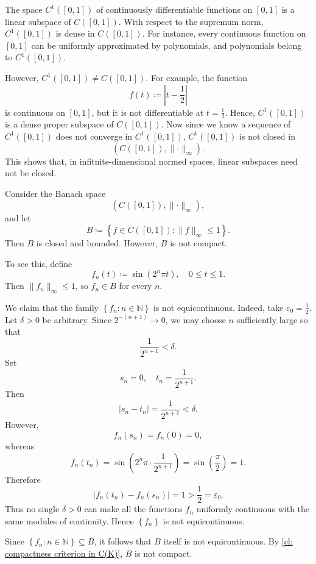 \begin{eg}
    The space \(C^1 ([0, 1])\) of continuously differentiable functions on \([0, 1]\) is a linear subspace of \(C([0, 1])\). With respect to the supremum norm, \(C^1 ([0, 1])\) is dense in \(C([0, 1])\). For instance, every continuous function on \([0, 1]\) can be uniformly approximated by polynomials, and polynomials belong to \(C^1 ([0, 1])\). 

    However, \(C^1 ([0, 1]) \neq C([0, 1])\). For example, the function 
    \[
        f(t) \coloneqq  \left\vert t - \frac{1}{2} \right\vert 
    \]         
    is continuous on \([0, 1]\), but it is not differentiable at \(t = \frac{1}{2}\). Hence, \(C^1 ([0, 1])\) is a dense proper subspace of \(C ([0, 1])\). Now since we know a sequence of \(C^1 ([0, 1])\) does not converge in \(C^1 ([0, 1])\), \(C^1 ([0, 1])\) is not closed in 
    \[
        \left( C([0, 1]), \lVert \cdot \rVert_\infty \right). 
    \]     
    This shows that, in infitnite-dimensional normed spaces, linear subspaces need not be closed.
\end{eg}

\begin{eg}
    Consider the Banach space 
    \[
        \left( C([0, 1]), \lVert \cdot \rVert_\infty  \right), 
    \]
    and let
    \[
        B \coloneqq \left\{ f \in C([0, 1]): \lVert f \rVert_\infty \le 1  \right\}. 
    \]
    Then \(B\) is closed and bounded. However, \(B\) is not compact. 

    To see this, define 
    \[
        f_n (t) \coloneqq \sin \left( 2^n \pi t \right), \quad 0 \le t \le 1. 
    \]  
    Then \(\lVert f_n \rVert_\infty \le 1 \), so \(f_n \in B\) for every \(n\). 

    We claim that the family \(\left\{ f_n: n \in \mathbb{N} \right\} \) is not equicontinuous. Indeed, take \(\varepsilon _0 = \frac{1}{2}\). Let \(\delta > 0\) be arbitrary. Since \(2^{-(n + 1)} \to 0\), we may choose \(n\) sufficiently large so that 
    \[
        \frac{1}{2^{n + 1}} < \delta.
    \]        
    Set 
    \[
        s_n = 0, \quad t_n = \frac{1}{2^{n + 1}}.
    \]
    Then 
    \[
        \vert s_n - t_n \vert = \frac{1}{2^{n + 1}} < \delta. 
    \]
    However, 
    \[
        f_n (s_n) = f_n (0) = 0,
    \]
    whereas 
    \[
        f_n (t_n) = \sin \left( 2^n \pi \cdot \frac{1}{2^{n+1} } \right) = \sin \left( \frac{\pi}{2} \right) = 1.  
    \]
    Therefore 
    \[
        \vert f_n (t_n) - f_n(s_n) \vert = 1 > \frac{1}{2} = \varepsilon_0. 
    \]
    Thus no single \(\delta > 0\) can make all the functions \(f_n\) uniformly continuous with the same modules of continuity. Hence \(\left\{ f_n \right\} \) is not equicontinuous. 

    Since \(\left\{ f_n: n \in \mathbb{N} \right\} \subseteq B\), it follows that \(B\) itself is not equicontinuous. By \autoref{cl: compactness criterion in C(K)}, \(B\) is not compact.        
\end{eg}

